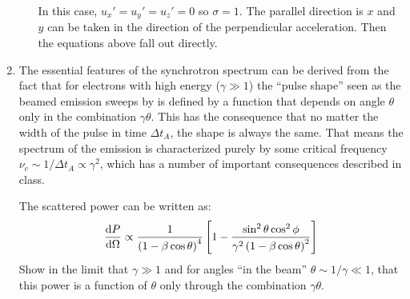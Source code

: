 \documentclass[11pt, preprint]{article}
\begin{document}
\begin{enumerate}
\begin{enumerate}
        \begin{answer}
        In this case, $u_x' = u_y' = u_z' = 0$ so $\sigma=1$. The
        parallel direction is $x$ and $y$ can be taken in the
        direction of the perpendicular acceleration. Then the
        equations above fall out directly.
        \end{answer}
      
    \end{enumerate}

\item The essential features of the synchrotron spectrum can be
  derived from the fact that for electrons with high energy ($\gamma
  \gg 1$) the ``pulse shape'' seen as the beamed emission sweeps by is
  defined by a function that depends on angle $\theta$ only in the
  combination $\gamma\theta$. This has the consequence that no matter
  the width of the pulse in time $\Delta t_A$, the shape is always the
  same. That means the spectrum of the emission is characterized
  purely by some critical frequency $\nu_c \sim 1 / \Delta t_A \propto
  \gamma^2$, which has a number of important consequences described in
  class.

  The scattered power can be written as:
  \begin{equation}
    \frac{{\rm d}P}{{\rm d}\Omega} \propto
    \frac{1}{\left(1-\beta\cos\theta\right)^4}
    \left[1 - \frac{\sin^2\theta \cos^2\phi}{\gamma^2 \left(1 -\beta
        \cos\theta\right)^2}\right]
  \end{equation}
  Show in the limit that $\gamma\gg 1$ and for angles ``in the beam''
  $\theta\sim 1/\gamma \ll 1$, that this power is a function of
  $\theta$ only through the combination $\gamma\theta$.


\end{enumerate}
\end{document}
